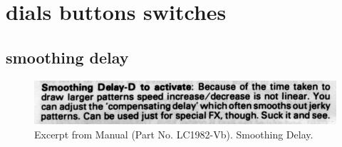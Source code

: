 \chapter{dials buttons switches} 
\section*{smoothing delay} 
\label{sec:delay}
\lstset{style=6502Style}

\begin{figure}[H]
    \centering
    \begin{adjustbox}{width=10.5cm,margin=0cm}
      \includegraphics[width=12cm]{src/delay/manual-entry.png}%
    \end{adjustbox}
    \caption{
      Excerpt from Manual (Part No. LC1982-Vb). Smoothing Delay.
      }
\end{figure}

